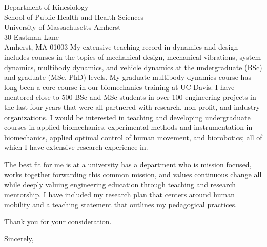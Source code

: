 \documentclass{letter}
\begin{document}
\begin{letter}{
  Department of Kinesiology \\
  School of Public Health and Health Sciences \\
  University of Massachusetts Amherst \\
  30 Eastman Lane \\
  Amherst, MA 01003
}
My extensive teaching record in dynamics and design includes courses in the
topics of mechanical design, mechanical vibrations, system dynamics, multibody
dynamics, and vehicle dynamics at the undergraduate (BSc) and graduate (MSc,
PhD) levels. My graduate multibody dynamics course has long been a core course
in our biomechanics training at UC Davis. I have mentored close to 500 BSc and
MSc students in over 100 engineering projects in the last four years that were
all partnered with research, non-profit, and industry organizations. I would be
interested in teaching and developing undergraduate courses in applied
biomechanics, experimental methods and instrumentation in biomechanics, applied
optimal control of human movement, and biorobotics; all of which I have
extensive research experience in.

The best fit for me is at a university has a department who is mission focused,
works together forwarding this common mission, and values continuous change all
while deeply valuing engineering education through teaching and research
mentorship. I have included my research plan that centers around human mobility
and a teaching statement that outlines my pedagogical practices.

Thank you for your consideration.

\closing{Sincerely,}

\end{letter}
\end{document}
